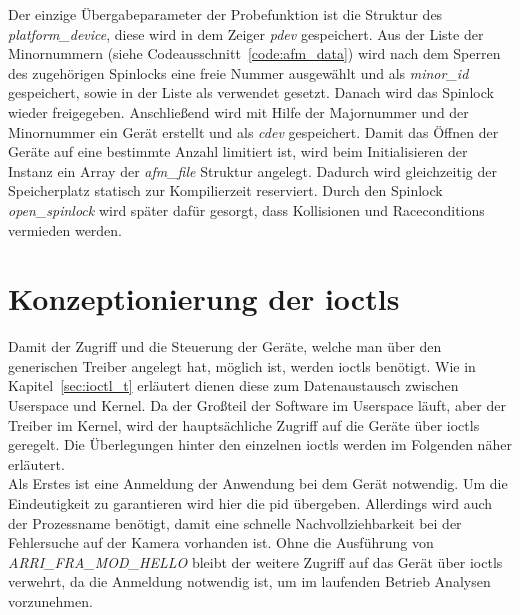 Der einzige Übergabeparameter der Probefunktion ist die Struktur des \textit{platform\_device}, diese wird in dem Zeiger \textit{pdev} gespeichert. 
Aus der Liste der Minornummern (siehe Codeausschnitt~\ref{code:afm_data}) wird nach dem Sperren des zugehörigen Spinlocks eine freie Nummer ausgewählt und als \textit{minor\_id} gespeichert, sowie in der Liste als verwendet gesetzt. Danach wird das Spinlock wieder freigegeben.
Anschließend wird mit Hilfe der Majornummer und der Minornummer ein Gerät erstellt und als \textit{cdev} gespeichert. 
Damit das Öffnen der Geräte auf eine bestimmte Anzahl limitiert ist, wird beim Initialisieren der Instanz ein Array der \textit{afm\_file} Struktur angelegt. Dadurch wird gleichzeitig der Speicherplatz statisch zur Kompilierzeit reserviert. Durch den Spinlock \textit{open\_spinlock} wird später dafür gesorgt, dass Kollisionen und Raceconditions vermieden werden.


\section{Konzeptionierung der \acl{ioctl}s}\label{sec:ioctl}
Damit der Zugriff und die Steuerung der Geräte, welche man über den generischen Treiber angelegt hat, möglich ist, werden \ac{ioctl}s benötigt. 
Wie in Kapitel~\ref{sec:ioctl_t} erläutert dienen diese zum Datenaustausch zwischen Userspace und Kernel. Da der Großteil der Software im Userspace läuft, aber der Treiber im Kernel, wird der hauptsächliche Zugriff auf die Geräte über \ac{ioctl}s geregelt. Die Überlegungen hinter den einzelnen \ac{ioctl}s werden im Folgenden näher erläutert.\\


Als Erstes ist eine Anmeldung der Anwendung bei dem Gerät notwendig. Um die Eindeutigkeit zu garantieren wird hier die \ac{pid} übergeben. Allerdings wird auch der Prozessname benötigt, damit eine schnelle Nachvollziehbarkeit bei der Fehlersuche auf der Kamera vorhanden ist.
Ohne die Ausführung von \mbox{\textit{ARRI\_FRA\_MOD\_HELLO}} bleibt der weitere Zugriff auf das Gerät über \ac{ioctl}s verwehrt, da die Anmeldung notwendig ist, um im laufenden Betrieb Analysen vorzunehmen.\\


